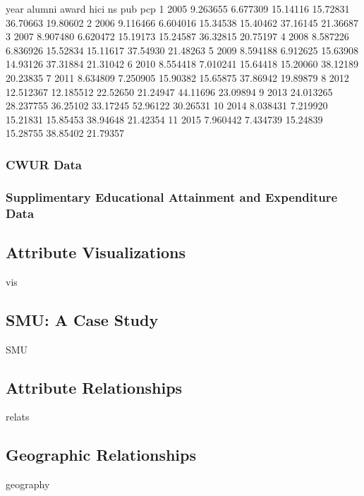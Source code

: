 \documentclass[12pt]{article}
\begin{document}
\begin{Schunk}
\begin{Soutput}
   year    alumni     award     hici       ns      pub      pcp
1  2005  9.263655  6.677309 15.14116 15.72831 36.70663 19.80602
2  2006  9.116466  6.604016 15.34538 15.40462 37.16145 21.36687
3  2007  8.907480  6.620472 15.19173 15.24587 36.32815 20.75197
4  2008  8.587226  6.836926 15.52834 15.11617 37.54930 21.48263
5  2009  8.594188  6.912625 15.63908 14.93126 37.31884 21.31042
6  2010  8.554418  7.010241 15.64418 15.20060 38.12189 20.23835
7  2011  8.634809  7.250905 15.90382 15.65875 37.86942 19.89879
8  2012 12.512367 12.185512 22.52650 21.24947 44.11696 23.09894
9  2013 24.013265 28.237755 36.25102 33.17245 52.96122 30.26531
10 2014  8.038431  7.219920 15.21831 15.85453 38.94648 21.42354
11 2015  7.960442  7.434739 15.24839 15.28755 38.85402 21.79357
\end{Soutput}
\end{Schunk}


\subsubsection{CWUR Data}
\subsubsection{Supplimentary Educational Attainment and Expenditure Data}


\subsection{Attribute Visualizations}
vis

\subsection{SMU: A Case Study}
SMU

\subsection{Attribute Relationships}
relats

\subsection{Geographic Relationships}
geography
\end{document}
